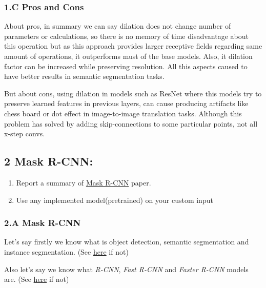 \documentclass[11pt]{article}
\providecommand{\tightlist}{%
      \setlength{\itemsep}{0pt}\setlength{\parskip}{0pt}}
\begin{document}
    \hypertarget{c-pros-and-cons}{%
\subsubsection{1.C Pros and Cons}\label{c-pros-and-cons}}

About pros, in summary we can say dilation does not change number of
parameters or calculations, so there is no memory of time disadvantage
about this operation but as this approach provides larger receptive
fields regarding same amount of operations, it outperforms must of the
base models. Also, it dilation factor can be increased while preserving
resolution. All this aspects caused to have better results in semantic
segmentation tasks.

But about cons, using dilation in models such as ResNet where this
models try to preserve learned features in previous layers, can cause
producing artifacts like chess board or dot effect in image-to-image
translation tasks. Although this problem has solved by adding
skip-connections to some particular points, not all x-step convs.

    \hypertarget{mask-r-cnn}{%
\subsection{2 Mask R-CNN:}\label{mask-r-cnn}}

\begin{enumerate}
\def\labelenumi{\arabic{enumi}.}
\tightlist
\item
  Report a summary of
  \href{http://openaccess.thecvf.com/content_ICCV_2017/papers/He_Mask_R-CNN_ICCV_2017_paper.pdf}{Mask
  R-CNN} paper.
\item
  Use any implemented model(pretrained) on your custom input
\end{enumerate}

    \hypertarget{a-mask-r-cnn}{%
\subsubsection{2.A Mask R-CNN}\label{a-mask-r-cnn}}

Let's say firstly we know what is object detection, semantic
segmentation and instance segmentation. (See
\href{https://github.com/Nikronic/Digital-Image-Processing-IUST/tree/master/HW11\#1-compare-semantic-segmentation-object-detection-and-instance-segmentation}{here}
if not)

Also let's say we know what \emph{R-CNN}, \emph{Fast R-CNN} and
\emph{Faster R-CNN} models are. (See
\href{https://github.com/Nikronic/Digital-Image-Processing-IUST/tree/master/HW11\#2-compare-rcnn-fast-rcnn-and-faster-rcnn}{here}
if not)
\end{document}
